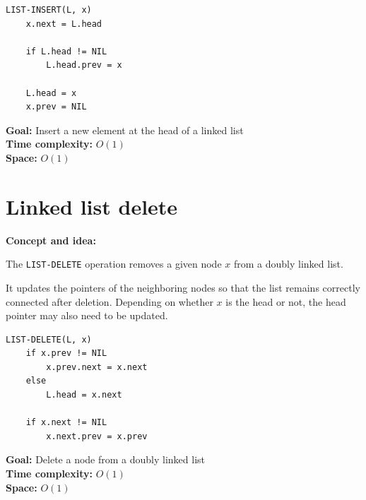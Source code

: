 \documentclass[11pt,a4paper,openany]{book}
\begin{document}
\begin{lstlisting}
LIST-INSERT(L, x)
    x.next = L.head

    if L.head != NIL
        L.head.prev = x

    L.head = x
    x.prev = NIL
\end{lstlisting}

\textbf{Goal:} Insert a new element at the head of a linked list \\

\textbf{Time complexity:} $O(1)$ \\

\textbf{Space:} $O(1)$












\vspace{2cm}






\section{Linked list delete}
\textbf{Concept and idea:}

The \texttt{LIST-DELETE} operation removes a given node $x$ from a doubly linked list.

It updates the pointers of the neighboring nodes so that the list remains correctly connected after deletion.  
Depending on whether $x$ is the head or not, the head pointer may also need to be updated.

\begin{lstlisting}
LIST-DELETE(L, x)
    if x.prev != NIL
        x.prev.next = x.next
    else
        L.head = x.next

    if x.next != NIL
        x.next.prev = x.prev
\end{lstlisting}

\textbf{Goal:} Delete a node from a doubly linked list \\

\textbf{Time complexity:} $O(1)$ \\

\textbf{Space:} $O(1)$









\vspace{2cm}
\end{document}
